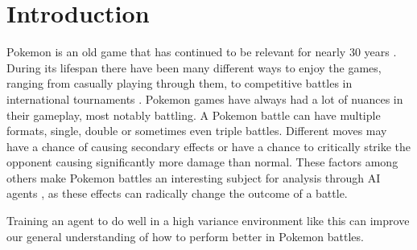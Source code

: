 \chapter{Introduction}
\label{chap:introduction}

    Pokemon is an old game that has continued to be relevant for nearly 30 years \cite{Pokemon}. 
During its lifespan there have been many different ways to enjoy the games, ranging from casually playing through them, 
to competitive battles in international tournaments \cite{WaysToPlayPokemon}. Pokemon games have always had a lot of 
nuances in their gameplay, most notably battling. A Pokemon battle can have multiple formats, single, double or sometimes 
even triple battles. Different moves may have a chance of causing secondary effects or have a chance to critically 
strike the opponent causing significantly more damage than normal. These factors among others make Pokemon battles an 
interesting subject for analysis through AI agents \cite{PokeEnv}, as these effects can radically change the outcome 
of a battle. 

Training an agent to do well in a high variance environment like this can improve our general understanding 
of how to perform better in Pokemon battles.


